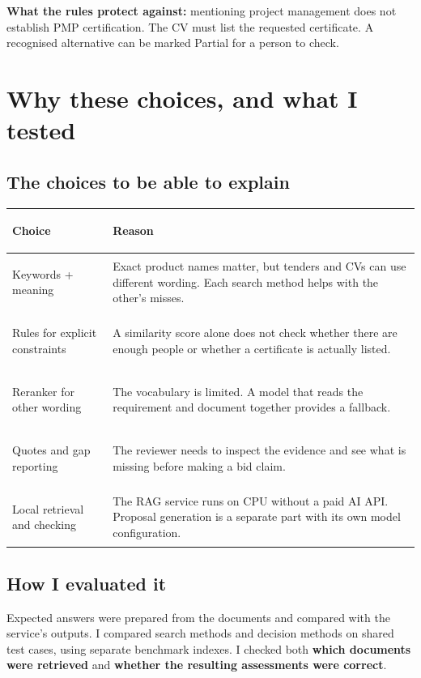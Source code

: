 \documentclass[11pt,a4paper]{article}
\begin{document}
\textbf{What the rules protect against:} mentioning project management does not establish PMP certification. The CV must list the requested certificate. A recognised alternative can be marked Partial for a person to check.

\newpage
\section{Why these choices, and what I tested}

\subsection{The choices to be able to explain}
\begin{tabularx}{\textwidth}{@{}>{\bfseries\raggedright\arraybackslash}p{4.0cm}Y@{}}
\toprule
Choice & Reason\\
\midrule
Keywords + meaning & Exact product names matter, but tenders and CVs can use different wording. Each search method helps with the other's misses.\\
Rules for explicit constraints & A similarity score alone does not check whether there are enough people or whether a certificate is actually listed.\\
Reranker for other wording & The vocabulary is limited. A model that reads the requirement and document together provides a fallback.\\
Quotes and gap reporting & The reviewer needs to inspect the evidence and see what is missing before making a bid claim.\\
Local retrieval and checking & The RAG service runs on CPU without a paid AI API. Proposal generation is a separate part with its own model configuration.\\
\bottomrule
\end{tabularx}

\subsection{How I evaluated it}
Expected answers were prepared from the documents and compared with the service's outputs. I compared search methods and decision methods on shared test cases, using separate benchmark indexes. I checked both \textbf{which documents were retrieved} and \textbf{whether the resulting assessments were correct}.
\end{document}
